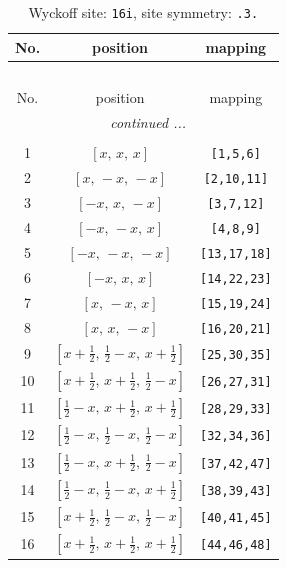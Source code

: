 \documentclass[fleqn,8pt]{jsarticle}
\begin{document}
\begin{longtable}{ccc}
\caption{Wyckoff site: {\tt 16i}, site symmetry: {\tt .3.}}
 \\
 \hline \hline
No. & position & mapping \\ \hline \endfirsthead

\multicolumn{2}{l}{\tablename\ \thetable{}} \\
 \hline \hline
No. & position & mapping \\ \hline \endhead

 \hline \hline
\multicolumn{2}{r}{\footnotesize\it continued ...} \\ \endfoot

 \hline \hline
\multicolumn{2}{r}{} \\ \endlastfoot

1 & $\left[ x,\, x,\, x \right]$ & {\tt [1,5,6]} \\ \hline
2 & $\left[ x,\, - x,\, - x \right]$ & {\tt [2,10,11]} \\ \hline
3 & $\left[ - x,\, x,\, - x \right]$ & {\tt [3,7,12]} \\ \hline
4 & $\left[ - x,\, - x,\, x \right]$ & {\tt [4,8,9]} \\ \hline
5 & $\left[ - x,\, - x,\, - x \right]$ & {\tt [13,17,18]} \\ \hline
6 & $\left[ - x,\, x,\, x \right]$ & {\tt [14,22,23]} \\ \hline
7 & $\left[ x,\, - x,\, x \right]$ & {\tt [15,19,24]} \\ \hline
8 & $\left[ x,\, x,\, - x \right]$ & {\tt [16,20,21]} \\ \hline
9 & $\left[ x + \frac{1}{2},\, \frac{1}{2} - x,\, x + \frac{1}{2} \right]$ & {\tt [25,30,35]} \\ \hline
10 & $\left[ x + \frac{1}{2},\, x + \frac{1}{2},\, \frac{1}{2} - x \right]$ & {\tt [26,27,31]} \\ \hline
11 & $\left[ \frac{1}{2} - x,\, x + \frac{1}{2},\, x + \frac{1}{2} \right]$ & {\tt [28,29,33]} \\ \hline
12 & $\left[ \frac{1}{2} - x,\, \frac{1}{2} - x,\, \frac{1}{2} - x \right]$ & {\tt [32,34,36]} \\ \hline
13 & $\left[ \frac{1}{2} - x,\, x + \frac{1}{2},\, \frac{1}{2} - x \right]$ & {\tt [37,42,47]} \\ \hline
14 & $\left[ \frac{1}{2} - x,\, \frac{1}{2} - x,\, x + \frac{1}{2} \right]$ & {\tt [38,39,43]} \\ \hline
15 & $\left[ x + \frac{1}{2},\, \frac{1}{2} - x,\, \frac{1}{2} - x \right]$ & {\tt [40,41,45]} \\ \hline
16 & $\left[ x + \frac{1}{2},\, x + \frac{1}{2},\, x + \frac{1}{2} \right]$ & {\tt [44,46,48]} \\
\end{longtable}
\end{document}
